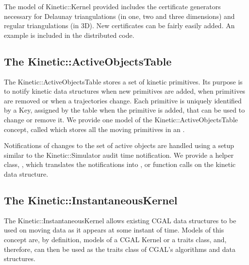 The model of Kinetic::Kernel provided includes the certificate
generators necessary for Delaunay triangulations (in one, two and
three dimensions) and regular triangulations (in 3D).  New
certificates can be fairly easily added. An example is included in the
distributed code.



\subsection{The Kinetic::ActiveObjectsTable}
\label{active_objects_table}

The Kinetic::ActiveObjectsTable stores a set of kinetic primitives.
Its purpose is to notify kinetic data structures when new primitives
are added, when primitives are removed or when a trajectories change.
Each primitive is uniquely identified by a Key, assigned by
the table when the primitive is added, that can be used to change or
remove it.  We provide one model of the
Kinetic::ActiveObjectsTable concept, called
 which stores all the moving
primitives in an .

Notifications of changes to the set of active objects are handled
using a setup similar to the Kinetic::Simulator audit time
notification. We provide a helper class,
, which translates the notifications into ,
 or  function calls on the kinetic data
structure.



\subsection{The Kinetic::InstantaneousKernel}
\label{instantaneous_kernel}

The Kinetic::InstantaneousKernel allows existing CGAL data structures
to be used on moving data as it appears at some instant of time.
Models of this concept are, by definition, models of a CGAL
Kernel or a traits class, and, therefore, can then be used as
the traits class of CGAL's algorithms and data structures.

